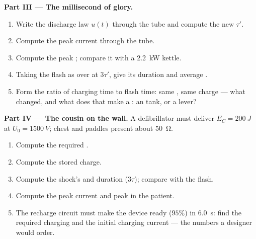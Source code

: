 \begin{problem}
\medskip
\noindent\textbf{Part III --- The millisecond of glory.}
\begin{enumerate}[resume]
  \item Write the discharge law $u(t)$ through the tube and compute the
        new  $\tau'$.
  \item Compute the peak current through the tube.
  \item Compute the peak ; compare it with a \qty{2.2}{kW} kettle.
  \item Taking the flash as over at $3\tau'$, give its duration and
        average .
  \item Form the ratio of charging time to flash time: same ,
        same charge --- what changed, and what does that make a
        : an  tank, or a  lever?
\end{enumerate}

\medskip
\noindent\textbf{Part IV --- The cousin on the wall.}
A defibrillator must deliver $E_C = \qty{200}{J}$ at
$U_0 = \qty{1500}{V}$; chest and paddles present about \qty{50}{\ohm}.
\begin{enumerate}[resume]
  \item Compute the required .
  \item Compute the stored charge.
  \item Compute the shock's  and duration ($3\tau$);
        compare with the flash.
  \item Compute the peak current and peak  in the patient.
  \item The recharge circuit must make the device ready ($95\%$) in
        \qty{6.0}{s}: find the required charging  and the
        initial charging current --- the numbers a designer would order.
\end{enumerate}
\end{problem}
